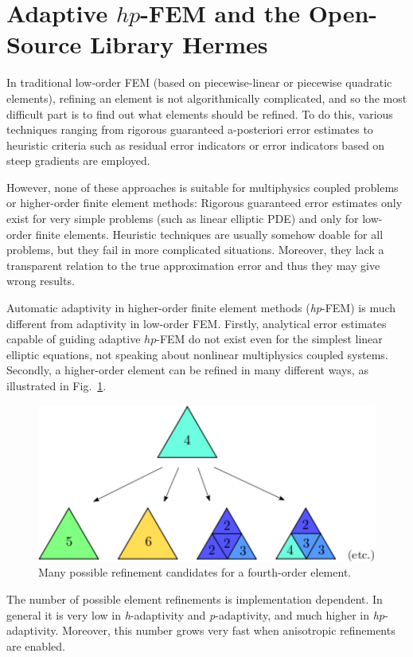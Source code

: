 \section{Adaptive $hp$-FEM and the Open-Source Library Hermes}
\label{sec:hermes}

In traditional low-order FEM (based on piecewise-linear or piecewise quadratic elements), 
refining an element is not algorithmically complicated,
and so the most difficult part is to find out what elements should be refined. 
To do this, various techniques ranging from rigorous guaranteed a-posteriori 
error estimates to heuristic criteria such as residual error indicators or
error indicators based on steep gradients are employed. 

However, none of these approaches is suitable for
multiphysics coupled problems or higher-order finite element methods: 
Rigorous guaranteed error estimates only exist for very simple problems 
(such as linear elliptic PDE) and only for low-order finite elements.
Heuristic techniques are usually somehow doable for all problems, but 
they fail in more complicated situations. Moreover, they lack a 
transparent relation to the true approximation error and thus they may
give wrong results.

Automatic adaptivity in higher-order finite element methods (\emph{hp}-FEM) 
is much different from adaptivity in low-order FEM. Firstly, analytical
error estimates capable of guiding adaptive $hp$-FEM do not exist even for 
the simplest linear elliptic equations, not speaking about nonlinear multiphysics 
coupled systems. Secondly,
a higher-order element can be refined in many different ways, as illustrated 
in Fig.~\ref{fig:refinements}.
\begin{figure}[!ht]
  \begin{centering}
  \includegraphics[width=0.5\columnwidth]{refinements}
  \caption{\label{fig:refinements} Many possible refinement candidates for a fourth-order
  element.}
  \end{centering}
\end{figure}

The number of possible element refinements is implementation dependent. 
In general it is very low in \emph{h}-adaptivity and \emph{p}-adaptivity, 
and much higher in \emph{hp}-adaptivity. Moreover, this number grows very 
fast when anisotropic refinements are enabled.


